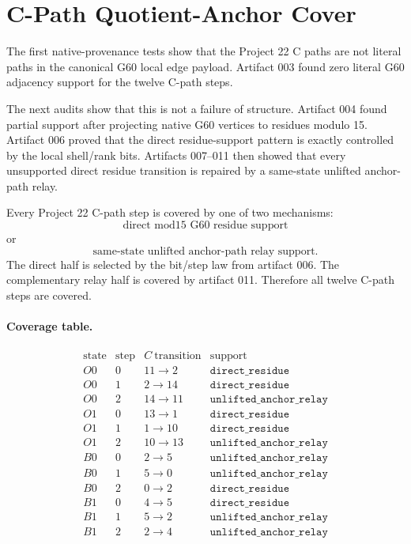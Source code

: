 \section{C-Path Quotient-Anchor Cover}

The first native-provenance tests show that the Project 22 C paths are not literal paths in the canonical G60 local edge payload.  Artifact 003 found zero literal G60 adjacency support for the twelve C-path steps.

The next audits show that this is not a failure of structure.  Artifact 004 found partial support after projecting native G60 vertices to residues modulo 15.  Artifact 006 proved that the direct residue-support pattern is exactly controlled by the local shell/rank bits.  Artifacts 007--011 then showed that every unsupported direct residue transition is repaired by a same-state unlifted anchor-path relay.

\begin{theorem}
Every Project 22 C-path step is covered by one of two mechanisms:
\[
    \text{direct mod15 G60 residue support}
\]
or
\[
    \text{same-state unlifted anchor-path relay support}.
\]
The direct half is selected by the bit/step law from artifact 006.  The complementary relay half is covered by artifact 011.  Therefore all twelve C-path steps are covered.
\end{theorem}

\paragraph{Coverage table.}
\[
\begin{array}{c|c|c|c}
\mathrm{state} & \mathrm{step} & C\ \mathrm{transition} & \mathrm{support}\\
\hline
O0 & 0 & 11\to 2 & \texttt{direct\_residue} \\
O0 & 1 & 2\to 14 & \texttt{direct\_residue} \\
O0 & 2 & 14\to 11 & \texttt{unlifted\_anchor\_relay} \\
O1 & 0 & 13\to 1 & \texttt{direct\_residue} \\
O1 & 1 & 1\to 10 & \texttt{direct\_residue} \\
O1 & 2 & 10\to 13 & \texttt{unlifted\_anchor\_relay} \\
B0 & 0 & 2\to 5 & \texttt{unlifted\_anchor\_relay} \\
B0 & 1 & 5\to 0 & \texttt{unlifted\_anchor\_relay} \\
B0 & 2 & 0\to 2 & \texttt{direct\_residue} \\
B1 & 0 & 4\to 5 & \texttt{direct\_residue} \\
B1 & 1 & 5\to 2 & \texttt{unlifted\_anchor\_relay} \\
B1 & 2 & 2\to 4 & \texttt{unlifted\_anchor\_relay} \\
\end{array}
\]

